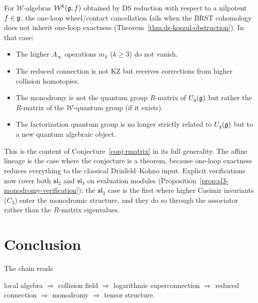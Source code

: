 \begin{remark}
\label{rem:beyond-affine-frontier}
For $\mathcal{W}$-algebras $\mathcal{W}^k(\mathfrak{g}, f)$ obtained by DS reduction with respect to a nilpotent $f \in \mathfrak{g}$, the one-loop wheel/contact cancellation fails when the BRST cohomology does not inherit one-loop exactness (Theorem~\ref{thm:ds-koszul-obstruction}). In that case:
\begin{itemize}
 \item The higher $A_\infty$ operations $m_k$ ($k \geq 3$) do not vanish.
 \item The reduced connection is not KZ but receives corrections from higher collision homotopies.
 \item The monodromy is not the quantum group $R$-matrix of $U_q(\mathfrak{g})$ but rather the $R$-matrix of the $\mathcal{W}$-quantum group (if it exists).
 \item The factorization quantum group is no longer strictly related to $U_q(\mathfrak{g})$ but to a new quantum algebraic object.
\end{itemize}
This is the content of Conjecture~\ref{conj:rmatrix} in its full generality. The affine lineage is the case where the conjecture is a theorem, because one-loop exactness reduces everything to the classical Drinfeld--Kohno input. Explicit verifications now cover both $\mathfrak{sl}_2$ and $\mathfrak{sl}_3$ on evaluation modules (Proposition~\ref{prop:sl3-monodromy-verification}); the $\mathfrak{sl}_3$ case is the first where higher Casimir invariants ($C_3$) enter the monodromic structure, and they do so through the associator rather than the $R$-matrix eigenvalues.
\end{remark}

\section{Conclusion}\label{sec:log-ht-conclusion}

The chain reads
\begin{center}
local algebra $\Longrightarrow$ collision field $\Longrightarrow$ logarithmic superconnection $\Longrightarrow$ reduced connection $\Longrightarrow$ monodromy $\Longrightarrow$ tensor structure.
\end{center}

